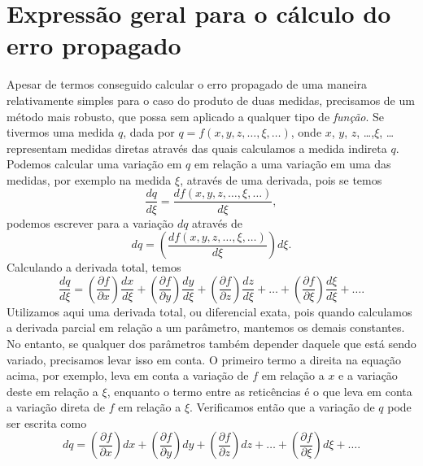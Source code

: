 \section{Expressão geral para o cálculo do erro propagado}
Apesar de termos conseguido calcular o erro propagado de uma maneira relativamente simples para o caso do produto de duas medidas, precisamos de um método mais robusto, que possa sem aplicado a qualquer tipo de \emph{função}. Se tivermos uma medida $q$, dada por $q=f(x,y,z,\dots,\xi,\dots)$, onde $x$, $y$, $z$, \dots,$\xi$, \dots representam medidas diretas através das quais calculamos a medida indireta $q$. Podemos calcular uma variação em $q$ em relação a uma variação em uma das medidas, por exemplo na medida $\xi$, através de uma derivada, pois se temos
\begin{equation}
	\frac{dq}{d\xi} = \frac{df(x,y,z,\dots,\xi,\dots)}{d\xi},
\end{equation}
%
podemos escrever para a variação $dq$ através de 
\begin{equation}
	dq = \left(\frac{df(x,y,z,\dots,\xi,\dots)}{d\xi}\right)d\xi.
\end{equation}
%
Calculando a derivada total, temos
\begin{equation}
	\frac{dq}{d\xi} = \left(\frac{\partial f}{\partial x}\right) \frac{dx}{d\xi} + \left(\frac{\partial f}{\partial y}\right)\frac{dy}{d\xi} + \left(\frac{\partial f}{\partial z}\right) \frac{dz}{d\xi} + \dots + \left(\frac{\partial f}{\partial \xi}\right) \frac{d\xi}{d\xi} + \dots.
\end{equation}
%
Utilizamos aqui uma derivada total, ou diferencial exata, pois quando calculamos a derivada parcial em relação a um parâmetro, mantemos os demais constantes. No entanto, se qualquer dos parâmetros também depender daquele que está sendo variado, precisamos levar isso em conta. O primeiro termo a direita na equação acima, por exemplo, leva em conta a variação de $f$ em relação a $x$ e a variação deste em relação a $\xi$, enquanto o termo entre as reticências é o que leva em conta a variação direta de $f$ em relação a $\xi$. Verificamos então que a variação de $q$ pode ser escrita como
\begin{equation}
	dq = \left(\frac{\partial f}{\partial x}\right) dx + \left(\frac{\partial f}{\partial y}\right) dy + \left(\frac{\partial f}{\partial z}\right) dz + \dots + \left(\frac{\partial f}{\partial \xi}\right) d\xi + \dots.
\end{equation}

